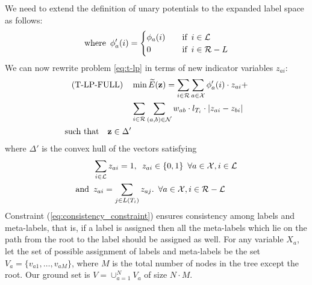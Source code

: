 We need to extend the definition of unary potentials to the expanded label space as follows:
\begin{align}
    \text{where} \enskip    \phi'_{a}(i) =  \begin{cases} 
        \phi_{a}(i) \quad &\text{if} \enskip i \in {\mathcal L} \\
        0  \quad &\text{if} \enskip i \in {\mathcal R - L} \\
    \end{cases}
\end{align}
%
We can now rewrite problem \eqref{eq:t-lp} in terms of new indicator variables $z_{ai}$:
%
\begin{align}
    \text{(T-LP-FULL)} \quad &\min \widetilde{E}({\bf z}) = \sum_{i \in \mathcal{R}} \sum_{a \in {\mathcal X}} \phi_a'(i) \cdot z_{ai} + \nonumber \\
            &\sum_{i \in \mathcal{R}} \sum_{(a, b) \in {\mathcal N}} w_{ab} \cdot l_{T_i} \cdot |z_{ai} - z_{bi}| \nonumber \\
    \text{such that} \quad {\bf z} \in \Delta'
\label{eq:t-lp-full}
\end{align}
   where $\Delta'$ is the convex hull of the vectors satisfying
\begin{align}
    \enskip &\sum_{i \in \mathcal{L}} z_{ai} = 1, \enskip z_{ai} \in \{0, 1\} \enskip \forall a \in {\mathcal X}, i \in \mathcal{L} \\
    \text{and} \enskip &z_{ai} = \sum_{j \in L(T_i) } z_{aj}.\enskip \forall a \in {\mathcal X}, i \in \mathcal{R - L} \label{eq:consistency_constraint} 
\end{align}
%
Constraint (\ref{eq:consistency_constraint}) ensures consistency among labels and meta-labels, that is, if a label is assigned then all the meta-labels which lie on the path from the root to the label should be assigned as well. 
%
 For any variable $X_a$, let the set of possible assignment of labels and meta-labels be the set $V_a = \{v_{a1}, \dots, v_{aM}\}$, where $M$ is the total number of nodes in the tree except the root. Our ground set is $V = \cup_{a = 1}^{N} V_a$ of size $N \cdot M$.

